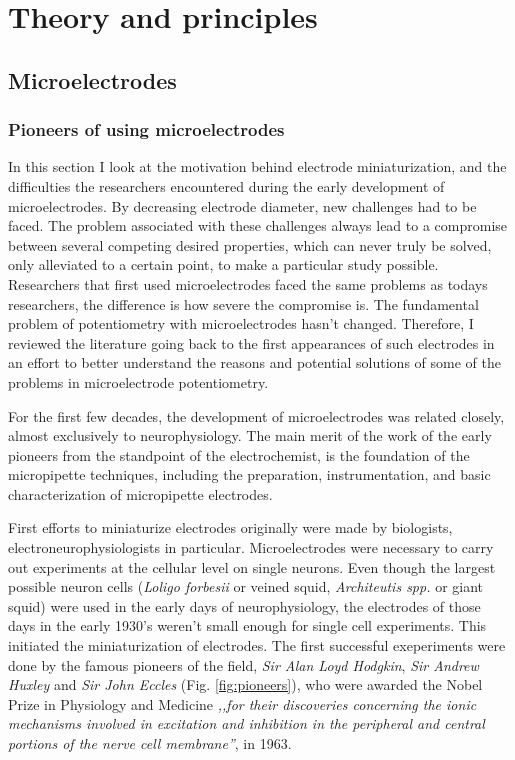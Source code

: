 \chapter{Theory and principles}
\section{Microelectrodes}
\subsection{Pioneers of using microelectrodes}
In this section I look at the motivation behind electrode miniaturization, and the difficulties the researchers encountered during the early development of microelectrodes.
By decreasing electrode diameter, new challenges had to be faced.
The problem associated with these challenges always lead to a compromise between several competing desired properties, which can never truly be solved, only alleviated to a certain point, to make a particular study possible.
Researchers that first used microelectrodes faced the same problems as todays researchers, the difference is how severe the compromise is.
The fundamental problem of potentiometry with microelectrodes hasn't changed.
Therefore, I reviewed the literature going back to the first appearances of such electrodes in an effort to better understand the reasons and potential solutions of some of the problems in microelectrode potentiometry.

For the first few decades, the development of microelectrodes was related closely, almost exclusively to neurophysiology.
The main merit of the work of the early pioneers from the standpoint of the electrochemist, is the foundation of the micropipette techniques, including the preparation, instrumentation, and basic characterization of micropipette electrodes.

First efforts to miniaturize electrodes originally were made by biologists, electroneurophysiologists in particular.
Microelectrodes were necessary to carry out experiments at the cellular level on single neurons.
Even though the largest possible neuron cells (\emph{Loligo forbesii} or veined squid, \emph{Architeutis spp.} or giant squid) were used in the early days of neurophysiology, the electrodes of those days in the early 1930's weren't small enough for single cell experiments.
This initiated the miniaturization of electrodes.
The first successful exeperiments were done by the famous pioneers of the field, \emph{Sir Alan Loyd Hodgkin}, \emph{Sir Andrew Huxley} and \emph{Sir John Eccles} (Fig. \ref{fig:pioneers}), who were awarded the Nobel Prize in Physiology and Medicine \emph{,,for their discoveries concerning the ionic mechanisms involved in excitation and inhibition in the peripheral and central portions of the nerve cell membrane''}, in 1963. 

